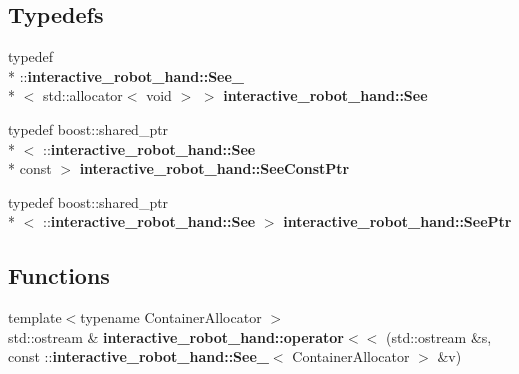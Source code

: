 \subsection*{Typedefs}
\begin{DoxyCompactItemize}
\item 
typedef \\*
\-::{\bf interactive\-\_\-robot\-\_\-hand\-::\-See\-\_\-}\\*
$<$ std\-::allocator$<$ void $>$ $>$ {\bf interactive\-\_\-robot\-\_\-hand\-::\-See}
\item 
typedef boost\-::shared\-\_\-ptr\\*
$<$ \-::{\bf interactive\-\_\-robot\-\_\-hand\-::\-See} \\*
const  $>$ {\bf interactive\-\_\-robot\-\_\-hand\-::\-See\-Const\-Ptr}
\item 
typedef boost\-::shared\-\_\-ptr\\*
$<$ \-::{\bf interactive\-\_\-robot\-\_\-hand\-::\-See} $>$ {\bf interactive\-\_\-robot\-\_\-hand\-::\-See\-Ptr}
\end{DoxyCompactItemize}
\subsection*{Functions}
\begin{DoxyCompactItemize}
\item 
{\footnotesize template$<$typename Container\-Allocator $>$ }\\std\-::ostream \& {\bf interactive\-\_\-robot\-\_\-hand\-::operator$<$$<$} (std\-::ostream \&s, const \-::{\bf interactive\-\_\-robot\-\_\-hand\-::\-See\-\_\-}$<$ Container\-Allocator $>$ \&v)
\end{DoxyCompactItemize}
